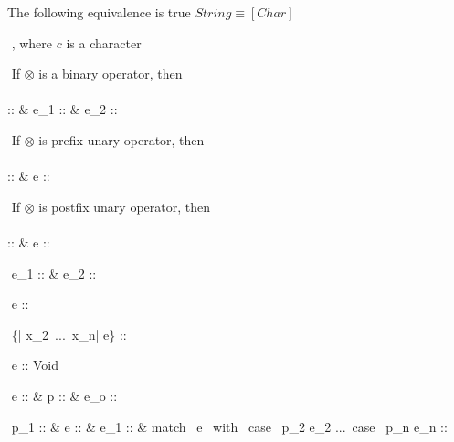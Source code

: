 \documentclass[12pt]{article}
\begin{document}
The following equivalence is true $String \equiv [Char]$

$ $\newline
{}
      {}
,\,\,where $c$ is a character

$ $\newline
If $\otimes$ is a binary operator, then\\\\
      {\Gamma \vdash \otimes :: \alpha \shortrightarrow \beta \shortrightarrow \tau 
      & \Gamma \vdash e_1 :: \alpha & \Gamma \vdash e_2 :: \beta}

$ $\newline
If $\otimes$ is prefix unary operator, then\\\\
      {\Gamma \vdash \otimes :: \alpha \shortrightarrow \tau 
      & \Gamma \vdash e :: \alpha}

$ $\newline
If $\otimes$ is postfix unary operator, then\\\\
    {\Gamma \vdash \otimes :: \alpha \shortrightarrow \tau 
    & \Gamma \vdash e :: \alpha}

$ $\newline
{}
      {\Gamma \vdash e_1 :: \alpha
      &  \vdash e_2 :: \tau}

$ $\newline
{}
      {\vdash e :: \beta }

$ $\newline
{}
      { \vdash \{| x_2\, ...\, x_n|\,\,e\} :: \beta}

$ $\newline 
{}
      {\Gamma \vdash e :: Void}

$ $\newline 
{}
      {\Gamma \vdash e :: \alpha
      & \Gamma \vdash p :: \alpha
      & \Gamma \vdash e_o :: \tau}

$ $\newline
{}
      {\Gamma \vdash p_1 :: \alpha
      & \Gamma \vdash e :: \alpha
      & \Gamma \vdash e_1 :: \tau
      & match \, e \, with \, case \, p_2 \Rightarrow e_2\,\,...\,
                              case \, p_n \Rightarrow e_n :: \tau}
\end{document}
